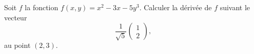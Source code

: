 \begin{exercice}\label{exocontrolecontinu0006}
  
Soit $f$ la fonction $f(x,y) = x^2-3x-5y^3$. Calculer la dérivée de $f$ suivant le vecteur 
\begin{equation}
 \frac{1}{\sqrt{5}} \begin{pmatrix}
   1\\
   2
 \end{pmatrix},
\end{equation}
au point $(2,3)$.

\end{exercice}
